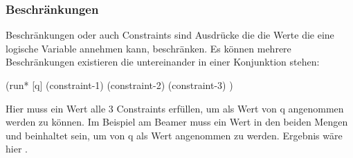 \subsubsection{Beschränkungen}

Beschränkungen oder auch Constraints sind Ausdrücke die die Werte die eine logische Variable annehmen kann, beschränken. Es können mehrere Beschränkungen existieren die untereinander in einer Konjunktion stehen:
\begin{lstlistings}
(run* [q]
    (constraint-1)
    (constraint-2)
    (constraint-3)
)
\end{lstlistings}
Hier muss ein Wert alle 3 Constraints erfüllen, um als Wert von q angenommen werden zu können.
Im Beispiel am Beamer muss ein Wert in den beiden Mengen \code{[1 2 3]} und \code{[2 3 4]} beinhaltet sein, um von q als Wert angenommen zu werden. Ergebnis wäre hier \code{[2 3]}.

